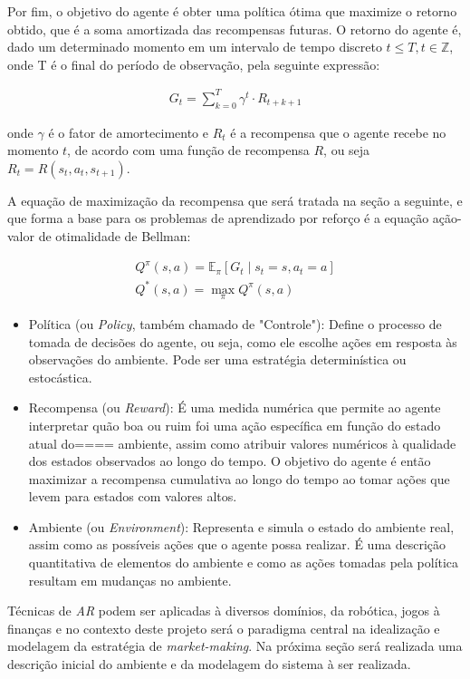 Por fim, o objetivo do agente é obter uma política ótima que maximize o retorno obtido, que é a soma amortizada das recompensas futuras. O retorno do agente é, dado um determinado momento em um intervalo de tempo discreto $t \leq T, t \in \mathbb{Z}$, onde T é o final do período de observação, pela seguinte expressão:

\begin{equation}
	\begin{aligned}
		G_{t} = \sum_{k=0}^{T} \gamma^t \cdot R_{t + k + 1}
	\end{aligned}
\end{equation}

onde $\gamma$ é o fator de amortecimento e $R_t$ é a recompensa que o agente recebe no momento $t$, de acordo com uma função de recompensa $R$, ou seja $R_t = R(s_{t}, a_{t}, s_{t + 1})$.

A equação de maximização da recompensa que será tratada na seção a seguinte, e que forma a base para os problemas de aprendizado por reforço é a equação ação-valor de otimalidade de Bellman:


\begin{equation}
	\begin{aligned}
		Q^{\pi}(s, a) = \mathbb{E}_{\pi} \left[ G_t \mid s_{t} = s, a_{t} = a \right]\\
		Q^{*}(s, a) = \max_{\pi} Q^{\pi}(s, a)		
	\end{aligned}
\end{equation}

\begin{itemize}
\item Política (ou \textit{Policy}, também chamado de "Controle"): Define o processo de tomada de decisões do agente, ou seja, como ele escolhe ações em resposta às observações do ambiente. Pode ser uma estratégia determinística ou estocástica.

\item Recompensa (ou \textit{Reward}): É uma medida numérica que permite ao agente interpretar quão boa ou ruim foi uma ação específica em função do estado atual do==== ambiente, assim como atribuir valores numéricos à qualidade dos estados observados ao longo do tempo. O objetivo do agente é então maximizar a recompensa cumulativa ao longo do tempo ao tomar ações que levem para estados com valores altos.

\item Ambiente (ou \textit{Environment}): Representa e simula o estado do ambiente real, assim como as possíveis ações que o agente possa realizar. É uma descrição quantitativa de elementos do ambiente e como as ações tomadas pela política resultam em mudanças no ambiente.
\end{itemize}

Técnicas de \textit{AR} podem ser aplicadas à diversos domínios, da robótica, jogos à finanças e no contexto deste projeto será o paradigma central na idealização e modelagem da estratégia de \textit{market-making}. Na próxima seção será realizada uma descrição inicial do ambiente e da modelagem do sistema à ser realizada.
